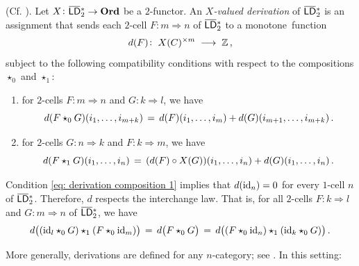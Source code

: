 \documentclass[reqno,12pt]{amsart}
\begin{document}
\begin{definition} (Cf. \cite[\S 2.4]{GuMa}).
Let \(X\colon \oLD_{2}^{\ast} \to \Ord\) be a \(2\)-functor. An \emph{$X$-valued derivation} of \(\oLD_{2}^{\ast}\) is an assignment that sends each \(2\)-cell \(F\colon m \Rightarrow n\) of \(\oLD_{2}^{\ast}\) to a monotone~function
\begin{equation*}
	d(F)\colon \; X(C)^{\times m} \;\longrightarrow\; \mathbb Z\,,
\end{equation*}
subject to the following compatibility conditions with respect to the compositions $\star_0$ and $\star_1$:

\begin{enumerate}
	\item for \(2\)-cells \(F\colon m \Rightarrow n\) and \(G\colon k \Rightarrow l\), we have
	\begin{equation}\label{eq: derivation composition 0}
		d(F \star_0 G){(i_1,\ldots,i_{m+k})}
		\,=\,
		d(F){(i_1,\ldots, i_m)} + d(G){(i_{m+1},\ldots, i_{m+k})}\,.
	\end{equation}
	\item for \(2\)-cells \(G\colon n \Rightarrow k\) and \(F\colon k \Rightarrow m\), we have
	\begin{equation}\label{eq: derivation composition 1}
		d(F \star_1 G){(i_1,\ldots,i_{n})} 
		\,=\,
		(d(F)\circ X(G)){(i_1,\ldots,i_n)} + d(G){(i_1,\ldots, i_n)}\,.
	\end{equation}
\end{enumerate}
\end{definition}

\begin{remark}\label{rem: d(id)=0}
Condition \eqref{eq: derivation composition 1} implies that $d({\operatorname{id}}_n)=0$ for every $1$-cell $n$ of \(\oLD_{2}^{\ast}\). Therefore, $d$ respects the interchange law. That is, for all $2$-cells $F\colon k \Rightarrow l$ and $G\colon m \Rightarrow n$ of \(\oLD_{2}^{\ast}\), we have
\begin{equation*}
	d\big(({\operatorname{id}}_l \star_0 G) \star_1 (F\star_0 {\operatorname{id}}_m)\big)\,=\, 
	d\big(F \star_0 G\big) \,=\,
	d\big((F \star_0 {\operatorname{id}}_n) \star_1 ({\operatorname{id}}_k\star_0 G)\big)
	\,.
\end{equation*}
\end{remark}

More generally, derivations are defined for any $n$-category; see \cite[\S 2.4]{GuMa}. In this setting:
\end{document}
